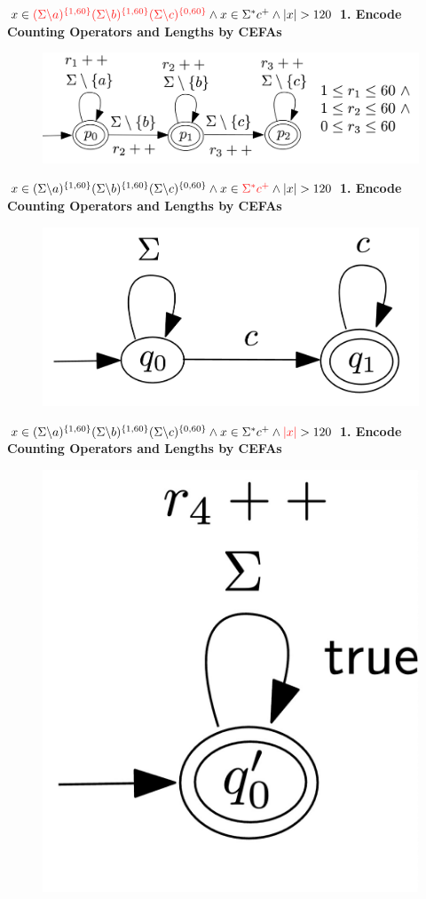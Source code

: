 \documentclass[landscape]{beamer}
\begin{document}
\begin{frame}{$ x\in \textcolor{red!90}{(\Sigma \backslash a)^{\{1,60\}}(\Sigma \backslash b)^{\{1,60\}}(\Sigma \backslash c)^{\{0,60\}}} \wedge x\in \Sigma^*c^+ \wedge |x| > 120$}
  \textbf{1. Encode Counting Operators and Lengths by CEFAs }
  \begin{figure}
    \includegraphics[width=\linewidth]{overview_regex1.jpg}
  \end{figure}
\end{frame}
\begin{frame}{$ x\in (\Sigma \backslash a)^{\{1,60\}}(\Sigma \backslash b)^{\{1,60\}}(\Sigma \backslash c)^{\{0,60\}} \wedge x\in \textcolor{red!90}{\Sigma^*c^+} \wedge |x| > 120$}
  \textbf{1. Encode Counting Operators and Lengths by CEFAs }
  \begin{figure}
    \includegraphics[width=.5\linewidth]{overview_regex2.jpg}
  \end{figure}
\end{frame}
\begin{frame}{$ x\in (\Sigma \backslash a)^{\{1,60\}}(\Sigma \backslash b)^{\{1,60\}}(\Sigma \backslash c)^{\{0,60\}} \wedge x\in \Sigma^*c^+ \wedge \textcolor{red!90}{|x|} > 120$}
  \textbf{1. Encode Counting Operators and Lengths by CEFAs}
  \begin{figure}
    \includegraphics[width=.25\linewidth]{overview_length_pre.jpg}
  \end{figure}
\end{frame}
\end{document}
